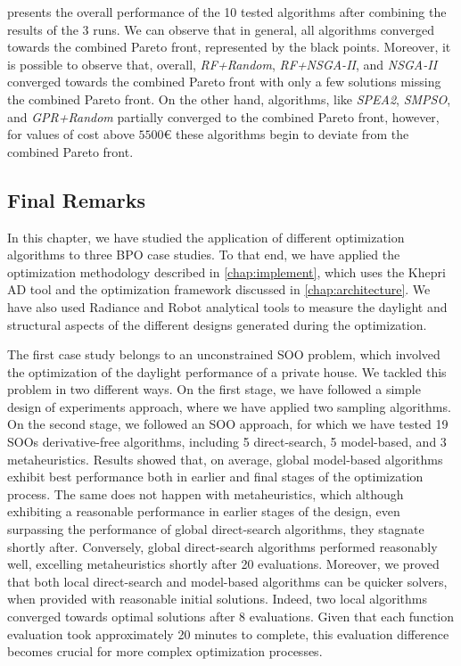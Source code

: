  presents the overall performance of the 10 tested algorithms after combining the results of the 3 runs. We can observe that in general, all algorithms converged towards the combined Pareto front, represented by the black points. Moreover, it is possible to observe that, overall, \textit{RF+Random}, \textit{RF+NSGA-II}, and \textit{\ac{NSGA-II}} converged towards the combined Pareto front with only a few solutions missing the combined Pareto front. On the other hand, algorithms, like \textit{\ac{SPEA2}}, \textit{SMPSO}, and \textit{GPR+Random} partially converged to the combined Pareto front, however, for values of cost above $5500$€ these algorithms begin to deviate from the combined Pareto front.

\subsection{Final Remarks}

In this chapter, we have studied the application of different optimization algorithms to three \ac{BPO} case studies. To that end, we have applied the optimization methodology described in \cref{chap:implement}, which uses the Khepri \ac{AD} tool and the optimization framework discussed in \cref{chap:architecture}. We have also used Radiance and Robot analytical tools to measure the daylight and structural aspects of the different designs generated during the optimization.

The first case study belongs to an unconstrained \ac{SOO} problem, which involved the optimization of the daylight performance of a private house. We tackled this problem in two different ways. On the first stage, we have followed a simple design of experiments approach, where we have applied two sampling algorithms. On the second stage, we followed an \ac{SOO} approach, for which we have tested 19 \acp{SOO} derivative-free algorithms, including 5 direct-search, 5 model-based, and 3 metaheuristics. Results showed that, on average, global model-based algorithms exhibit best performance both in earlier and final stages of the optimization process. The same does not happen with metaheuristics, which although exhibiting a reasonable performance in earlier stages of the design, even surpassing the performance of global direct-search algorithms, they stagnate shortly after. Conversely, global direct-search algorithms performed reasonably well, excelling metaheuristics shortly after 20 evaluations. Moreover, we proved that both local direct-search and model-based algorithms can be quicker solvers, when provided with reasonable initial solutions. Indeed, two local algorithms converged towards optimal solutions after 8 evaluations. Given that each function evaluation took approximately 20 minutes to complete, this evaluation difference becomes crucial for more complex optimization processes.

